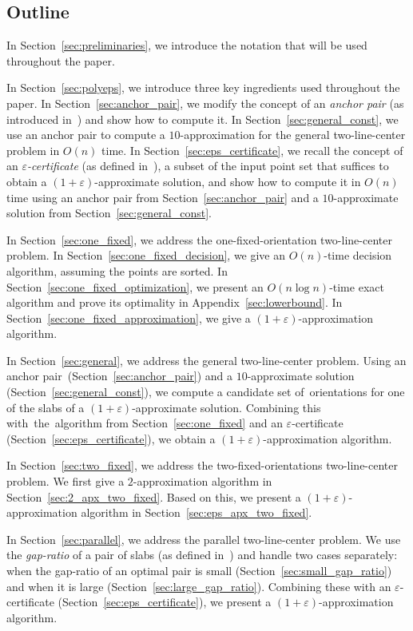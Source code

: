 \documentclass[10pt,a4paper]{article}
\theoremstyle{star}
\theoremstyle{claimstar}
\newcommand{\eps}{\ensuremath{\varepsilon}}
\begin{document}
\newpage
\subsection{Outline}
In Section~\ref{sec:preliminaries}, we introduce the notation that will be used throughout the paper.

In Section~\ref{sec:polyeps}, we introduce three key ingredients used throughout the paper.
In Section~\ref{sec:anchor_pair}, we modify the concept of an \emph{anchor pair} (as introduced in~\cite{agarwalTwo}) and show how to compute it.
In Section~\ref{sec:general_const}, we use an anchor pair to compute a $10$-approximation for the general two-line-center problem in $O(n)$ time.
In Section~\ref{sec:eps_certificate}, we recall the concept of an \emph{$\eps$-certificate} (as defined in~\cite{agarwal2005approximation}), a subset of the input point set that suffices to obtain a $(1+\eps)$-approximate solution, and show how to compute it in $O(n)$ time using an anchor pair from Section~\ref{sec:anchor_pair} and a $10$-approximate solution from Section~\ref{sec:general_const}.

In Section~\ref{sec:one_fixed}, we address the one-fixed-orientation two-line-center problem.
In Section~\ref{sec:one_fixed_decision}, we give an $O(n)$-time decision algorithm, assuming the points are sorted.
In Section~\ref{sec:one_fixed_optimization}, we present an $O(n\log n)$-time exact algorithm and prove its optimality in Appendix~\ref{sec:lowerbound}.
In Section~\ref{sec:one_fixed_approximation}, we give a $(1+\eps)$-approximation algorithm.

In Section~\ref{sec:general}, we address the general two-line-center problem.
Using an anchor pair~(Section~\ref{sec:anchor_pair}) and a $10$-approximate solution (Section~\ref{sec:general_const}), we compute a candidate set of~orientations for one of the slabs of a $(1+\eps)$-approximate solution.
Combining this with~the~algorithm from Section~\ref{sec:one_fixed} and an $\eps$-certificate (Section~\ref{sec:eps_certificate}), we obtain a $(1+\eps)$-approximation algorithm.

In Section~\ref{sec:two_fixed}, we address the two-fixed-orientations two-line-center problem.
We first give a $2$-approximation algorithm in Section~\ref{sec:2_apx_two_fixed}. 
Based on this, we present a $(1+\eps)$-approximation algorithm in Section~\ref{sec:eps_apx_two_fixed}.

In Section~\ref{sec:parallel}, we address the parallel two-line-center problem.
We use the \emph{gap-ratio} of a pair of slabs (as defined in~\cite{chung2025parallel}) and handle two cases separately: when the gap-ratio of an optimal pair is small (Section~\ref{sec:small_gap_ratio}) and when it is large (Section~\ref{sec:large_gap_ratio}).
Combining these with an $\eps$-certificate (Section~\ref{sec:eps_certificate}), we present a $(1+\eps)$-approximation algorithm.
\end{document}
